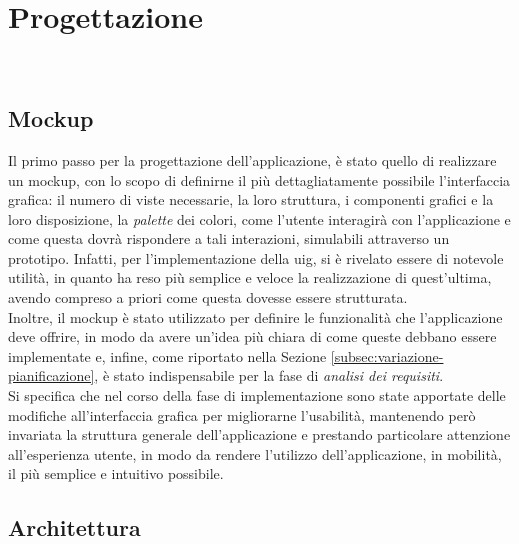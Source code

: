 \chapter{Progettazione}
\label{cap:progettazione}

\\

\section{Mockup}
\label{sec:mockup}

Il primo passo per la progettazione dell'applicazione, è stato quello di realizzare un \gls{mockup}\glsoccur, con lo scopo di definirne il più dettagliatamente possibile l'interfaccia grafica: il numero di viste necessarie, la loro struttura, i componenti grafici e la loro disposizione, la \emph{palette} dei colori, come l'utente interagirà con l'applicazione e come questa dovrà rispondere a tali interazioni, simulabili attraverso un prototipo. Infatti, per l'implementazione della \gls{uig}\glsoccur, si è rivelato essere di notevole utilità, in quanto ha reso più semplice e veloce la realizzazione di quest'ultima, avendo compreso a priori come questa dovesse essere strutturata.\\
Inoltre, il \gls{mockup} è stato utilizzato per definire le funzionalità che l'applicazione deve offrire, in modo da avere un'idea più chiara di come queste debbano essere implementate e, infine, come riportato nella Sezione \ref{subsec:variazione-pianificazione}, è stato indispensabile per la fase di \emph{analisi dei requisiti}.\\ 
Si specifica che nel corso della fase di implementazione sono state apportate delle modifiche all'interfaccia grafica per migliorarne l'usabilità, mantenendo però invariata la struttura generale dell'applicazione e prestando particolare attenzione all'esperienza utente, in modo da rendere l'utilizzo dell'applicazione, in mobilità, il più semplice e intuitivo possibile.

\section{Architettura}
\label{sec:architettura}


